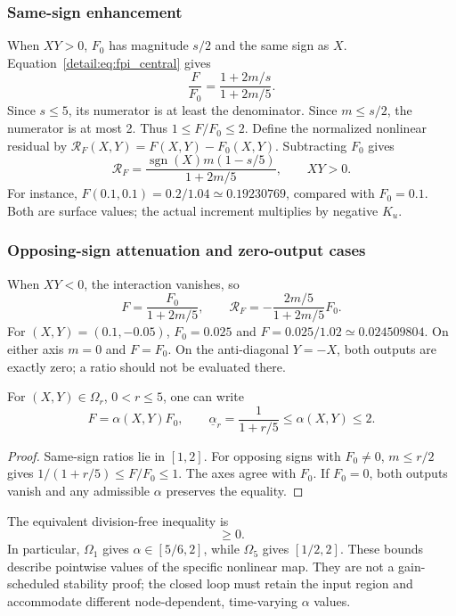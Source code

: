\subsubsection{Same-sign enhancement}
When $XY>0$, $F_0$ has magnitude $s/2$ and the same sign as $X$.
Equation~\eqref{detail:eq:fpi_central} gives
\begin{equation}
 \frac{F}{F_0}=\frac{1+2m/s}{1+2m/5}.
 \label{detail:eq:fpi_same_sign}
\end{equation}
Since $s\le5$, its numerator is at least the denominator. Since
$m\le s/2$, the numerator is at most 2. Thus $1\le F/F_0\le2$.
Define the normalized nonlinear residual by
$\mathcal R_F(X,Y)=F(X,Y)-F_0(X,Y)$. Subtracting $F_0$ gives
\begin{equation}
 \mathcal R_F=
 \frac{\operatorname{sgn}(X)m(1-s/5)}{1+2m/5},\qquad XY>0.
 \label{detail:eq:fpd_same_residual}
\end{equation}
For instance, $F(0.1,0.1)=0.2/1.04\simeq0.19230769$, compared with
$F_0=0.1$. Both are surface values; the actual increment multiplies by
negative $K_u$.

\subsubsection{Opposing-sign attenuation and zero-output cases}
When $XY<0$, the interaction vanishes, so
\begin{equation}
 F=\frac{F_0}{1+2m/5},\qquad
 \mathcal R_F=-\frac{2m/5}{1+2m/5}F_0.
 \label{detail:eq:fpi_opposite_sign}
\end{equation}
For $(X,Y)=(0.1,-0.05)$, $F_0=0.025$ and
$F=0.025/1.02\simeq0.024509804$. On either axis $m=0$ and $F=F_0$.
On the anti-diagonal $Y=-X$, both outputs are exactly zero; a ratio should
not be evaluated there.

\begin{btdcorollary}
\label{detail:cor:fpi_sector}
For $(X,Y)\in\Omega_r$, $0<r\le5$, one can write
\begin{equation}
 F=\alpha(X,Y)F_0,\qquad
 \underline\alpha_r=\frac1{1+r/5}\le\alpha(X,Y)\le2.
 \label{detail:eq:fpi_sector}
\end{equation}
\end{btdcorollary}
\begin{proof}
Same-sign ratios lie in $[1,2]$. For opposing signs with $F_0\ne0$,
$m\le r/2$ gives $1/(1+r/5)\le F/F_0\le1$.
The axes agree with $F_0$. If $F_0=0$, both outputs vanish and any
admissible $\alpha$ preserves the equality.
\end{proof}
The equivalent division-free inequality is
\begin{equation}
 [F-\underline\alpha_r F_0][2F_0-F]\ge0.
 \label{detail:eq:fpi_sector_product}
\end{equation}
In particular, $\Omega_1$ gives $\alpha\in[5/6,2]$, while
$\Omega_5$ gives $[1/2,2]$. These bounds describe pointwise values of
the specific nonlinear map. They are not a gain-scheduled stability proof;
the closed loop must retain the input region and accommodate different
node-dependent, time-varying $\alpha$ values.

